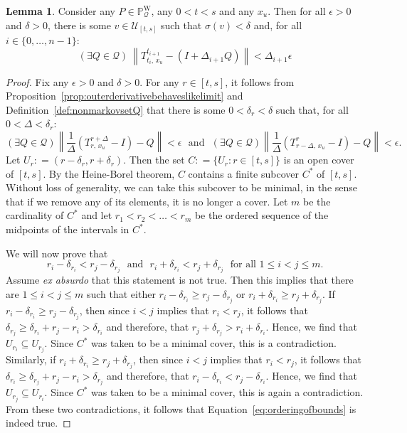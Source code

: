 \documentclass[10pt]{paper}
\theoremstyle{definition}
\newtheorem{lemma}[theorem]{Lemma}
\newcommand{\processes}{\mathbb{P}}
\newcommand{\wprocesses}{\processes^{\mathrm{W}}}
\newcommand{\rateset}{\mathcal{Q}}
\newcommand{\norm}[1]{\left\lVert #1 \right\rVert}
\newcommand{\coloneqq}{:\!=}
\begin{document}
\begin{lemma}\label{lemma:bound_on_linear_approx_partition}
Consider any $P\in\wprocesses_\rateset$, any $0<t<s$ and any $x_u$. Then for all $\epsilon>0$ and $\delta>0$, there is some $v\in\mathcal{U}_{[t,s]}$ such that $\sigma(v)<\delta$ and, for all $i\in\{0,\dots,n-1\}$:
\begin{equation*}
(\exists Q\in\rateset)
~
\norm{
T^{t_{i+1}}_{t_i,\,x_u}-(I+\Delta_{i+1}Q)
}<\Delta_{i+1}\epsilon
\end{equation*}
\end{lemma}
\begin{proof}
Fix any $\epsilon>0$ and $\delta>0$.
For any $r\in[t,s]$, it follows from Proposition~\ref{prop:outerderivativebehaveslikelimit} and Definition~\eqref{def:nonmarkovsetQ} that there is some $0<\delta_r<\delta$ such that, for all $0<\Delta<\delta_r$:
\begin{equation}\label{eq:epsilonboundsforlemma}
(\exists Q\in\rateset)
\norm{\frac{1}{\Delta}
(T^{r+\Delta}_{r,\,x_u}-I)-Q}<\epsilon
\text{~~and~~}
(\exists Q\in\rateset)
\norm{\frac{1}{\Delta}
(T^{r}_{r-\Delta,\,x_u}-I)-Q}<\epsilon.
\end{equation}
Let $U_r\coloneqq(r-\delta_r,r+\delta_r)$. Then the set $C\coloneqq\{U_r\colon r\in[t,s]\}$ is an open cover of $[t,s]$. By the Heine-Borel theorem, $C$ contains a finite subcover $C^*$ of $[t,s]$. Without loss of generality, we can take this subcover to be minimal, in the sense that if we remove any of its elements, it is no longer a cover. Let $m$ be the cardinality of $C^*$ and let $r_1<r_2<\dots<r_m$ be the ordered sequence of the midpoints of the intervals in $C^*$.

We will now prove that
\begin{equation}\label{eq:orderingofbounds}
r_i-\delta_{r_i}<r_j-\delta_{r_j}
\text{~~and~~}
r_i+\delta_{r_i}<r_j+\delta_{r_j}
\text{~~for all $1\leq i<j\leq m$.}
\end{equation}
Assume \emph{ex absurdo} that this statement is not true. Then this implies that there are $1\leq i<j\leq m$ such that either $r_i-\delta_{r_i}\geq r_j-\delta_{r_j}$ or $r_i+\delta_{r_i}\geq r_j+\delta_{r_j}$. If $r_i-\delta_{r_i}\geq r_j-\delta_{r_j}$, then since $i<j$ implies that $r_i<r_j$, it follows that $\delta_{r_j}\geq\delta_{r_i}+r_j-r_i>\delta_{r_i}$ and therefore, that $r_j+\delta_{r_j}>r_i+\delta_{r_i}$. 
Hence, we find that $U_{r_i}\subseteq U_{r_j}$. Since $C^*$ was taken to be a minimal cover, this is a contradiction.
Similarly, if $r_i+\delta_{r_i}\geq r_j+\delta_{r_j}$, then since $i<j$ implies that $r_i<r_j$, it follows that $\delta_{r_i}\geq\delta_{r_j}+r_j-r_i>\delta_{r_j}$ and therefore, that $r_i-\delta_{r_i}<r_j-\delta_{r_i}$. Hence, we find that $U_{r_j}\subseteq U_{r_i}$. Since $C^*$ was taken to be a minimal cover, this is again a contradiction. From these two contradictions, it follows that Equation~\eqref{eq:orderingofbounds} is indeed true.


\end{proof}
\end{document}
